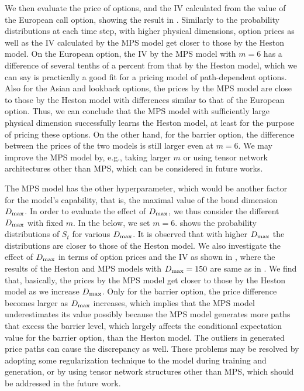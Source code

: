 {We then evaluate the price of options, and the IV calculated from the value of the European call option, showing the result in .
Similarly to the probability distributions at each time step, with higher physical dimensions, option prices as well as the IV calculated by the MPS model get closer to those by the Heston model. 
On the European option, the IV by the MPS model with $m=6$ has a difference of several tenths of a percent from that by the Heston model, which we can say is practically a good fit for a pricing model of path-dependent options.
Also for the Asian and lookback options,
the prices by the MPS model are close to those by the Heston model with differences similar to that of the European option.
Thus, we can conclude that the MPS model with sufficiently large physical dimension successfully learns the Heston model, at least for the purpose of pricing these options.
On the other hand, for the barrier option, the difference between the prices of the two models is still larger even at $m=6$.
We may improve the MPS model by, e.g., taking larger $m$ or using tensor network architectures other than MPS, which can be considered in future works.


The MPS model has the other hyperparameter, which would be another factor for the model's capability, that is, the maximal value of the bond dimension $D_{\rm max}$.
In order to evaluate the effect of $D_{\rm max}$, we thus consider the different $D_{\rm max}$ with fixed $m$. In the below, we set $m=6$.
 shows the probability distributions of $S_t$ for various $D_{\rm max}$.
It is observed that with higher $D_{\rm max}$ the distributions are closer to those of the Heston model.
We also investigate the effect of $D_{\rm max}$ in terms of option prices and the IV as shown in , where the results of the Heston and MPS models with $D_{\rm max} = 150$ are same as in .
We find that, basically, the prices by the MPS model get closer to those by the Heston model as we increase $D_{\rm max}$.
Only for the barrier option, the price difference becomes larger as $D_{\rm max}$ increases, which implies that the MPS model underestimates its value possibly because the MPS model generates more paths that excess the barrier level, which largely affects the conditional expectation value for the barrier option, than the Heston model.
The outliers in generated price paths can cause the discrepancy as well.
These problems may be resolved by adopting some regularization technique to the model during training and generation, or by using tensor network structures other than MPS, which should be addressed in the future work.


}
